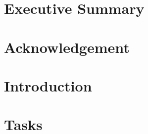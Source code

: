 \documentclass{article}
\begin{document}


\newpage
\tableofcontents

\section{Executive Summary}


\section{Acknowledgement}


\section{Introduction}














\section{Tasks}











\newpage

\end{document}
